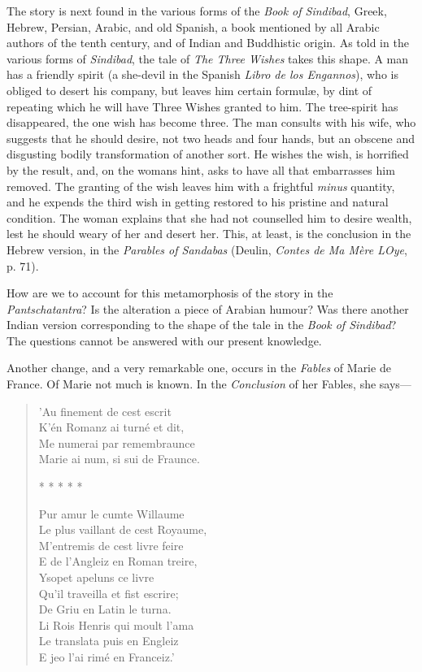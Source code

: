 \documentclass[14pt,a4paper]{memoir}
\begin{document}
{The story is next found in the various forms of the \emph{Book of
Sindibad}, Greek, Hebrew, Persian, Arabic, and old Spanish, a book
mentioned by all Arabic authors of the tenth century, and of Indian and
Buddhistic
origin.
As told in the various forms of \emph{Sindibad}, the tale of \emph{The
Three Wishes} takes this shape. A man has a friendly spirit (a she-devil
in the Spanish \emph{Libro de los Engannos}), who is obliged to desert
his company, but leaves him certain formulæ, by dint of repeating which
he will have Three Wishes granted to him. The tree-spirit has
disappeared, the one wish has become three. The man consults with his
wife, who suggests that he should desire, not two heads and four hands,
but an obscene and disgusting bodily transformation of another sort. He
wishes the wish, is horrified by the result, and, on the
woman\textquotesingle s hint, asks to have all that embarrasses him
removed. The granting of the wish leaves him with \textquotesingle a
frightful \emph{minus} quantity,\textquotesingle{} and he expends the
third wish in getting restored to his pristine and natural condition.
The woman explains that she had not counselled him to desire wealth,
lest he should weary of her and desert her. This, at least, is the
conclusion in the Hebrew version, in the \emph{Parables of Sandabas}
(Deulin, \emph{Contes de Ma Mère L\textquotesingle Oye}, p. 71).

How are we to account for this metamorphosis of the story in the
\emph{Pantschatantra}? Is the alteration a piece of Arabian humour? Was
there another Indian version corresponding to the shape of the tale in
the \emph{Book of Sindibad}? The questions cannot be answered with our
present knowledge.

Another change, and a very remarkable one, occurs in the \emph{Fables}
of Marie de France. Of Marie not much is known. In the \emph{Conclusion}
of her Fables, she says---

\begin{verse}
  \small
'Au finement de cest escrit \\
K'én Romanz ai turné et dit, \\
Me numerai par remembraunce \\
Marie ai num, si sui de Fraunce.

* * * * *

Pur amur le cumte Willaume \\
Le plus vaillant de cest Royaume, \\
M'entremis de cest livre feire \\
E de l'Angleiz en Roman treire, \\
Ysopet apeluns ce livre \\
Qu'il traveilla et fist escrire; \\
De Griu en Latin le turna. \\
Li Rois Henris qui moult l'ama \\
Le translata puis en Engleiz \\
E jeo l'ai rimé en Franceiz.'
\end{verse}

}
\end{document}
